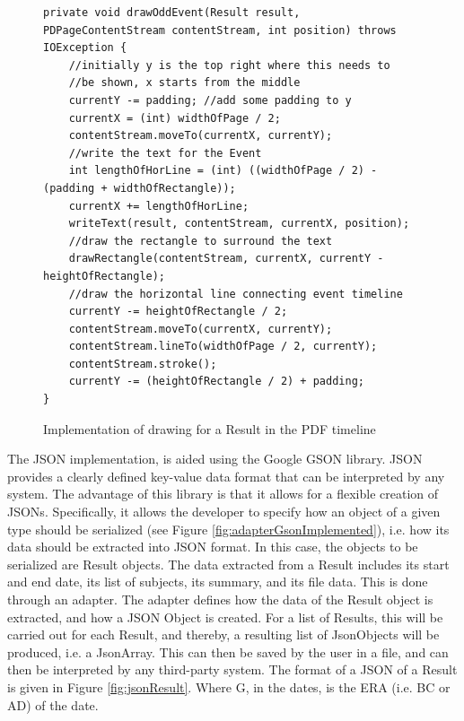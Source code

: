 \begin{figure}[H]
\begin{lstlisting}
private void drawOddEvent(Result result, PDPageContentStream contentStream, int position) throws IOException {
	//initially y is the top right where this needs to 
	//be shown, x starts from the middle
	currentY -= padding; //add some padding to y
	currentX = (int) widthOfPage / 2;
	contentStream.moveTo(currentX, currentY);
	//write the text for the Event
	int lengthOfHorLine = (int) ((widthOfPage / 2) - (padding + widthOfRectangle));
	currentX += lengthOfHorLine;
	writeText(result, contentStream, currentX, position);
	//draw the rectangle to surround the text
	drawRectangle(contentStream, currentX, currentY - heightOfRectangle);
	//draw the horizontal line connecting event timeline
	currentY -= heightOfRectangle / 2;
	contentStream.moveTo(currentX, currentY);
	contentStream.lineTo(widthOfPage / 2, currentY);
	contentStream.stroke();
	currentY -= (heightOfRectangle / 2) + padding;
}
\end{lstlisting}
\caption{Implementation of drawing for a Result in the PDF timeline}
\label{fig:drawRecImplemented}
\end{figure}

\par The JSON implementation, is aided using the Google GSON library. JSON provides a clearly defined key-value data format that can be interpreted by any system. The advantage of this library is that it allows for a flexible creation of JSONs. Specifically, it allows the developer to specify how an object of a given type should be serialized (see Figure \ref{fig:adapterGsonImplemented}), i.e. how its data should be extracted into JSON format. In this case, the objects to be serialized are Result objects. The data extracted from a Result includes its start and end date, its list of subjects, its summary, and its file data. This is done through an adapter. The adapter defines how the data of the Result object is extracted, and how a JSON Object is created. For a list of Results, this will be carried out for each Result, and thereby, a resulting list of JsonObjects will be produced, i.e. a JsonArray. This can then be saved by the user in a file, and can then be interpreted by any third-party system. The format of a JSON of a Result is given in Figure \ref{fig:jsonResult}. Where G, in the dates, is the ERA (i.e. BC or AD) of the date.

